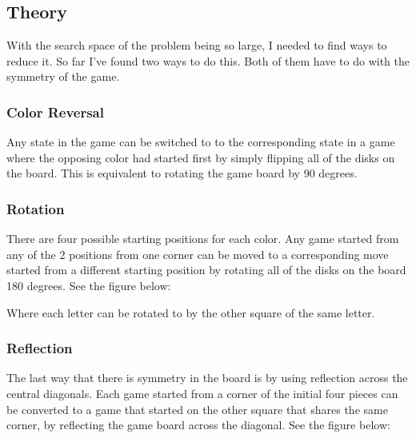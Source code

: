 \documentclass{article}
\begin{document}
\subsection{Theory}

With the search space of the problem being so large, I needed to find ways to reduce it. So far I've found two ways to do this. Both of them have to do with the symmetry of the game.

\subsubsection{Color Reversal}

Any state in the game can be switched to to the corresponding state in a game where the opposing color had started first by simply flipping all of the disks on the board. This is equivalent to rotating the game board by 90 degrees.

\subsubsection{Rotation}

There are four possible starting positions for each color. Any game started from any of the 2 positions from one corner can be moved to a corresponding move started from a different starting position by rotating all of the disks on the board 180 degrees. See the figure below:

\begin{othelloboard}{0.75}
\dotmarkings
{}
\end{othelloboard}

Where each letter can be rotated to by the other square of the same letter.

\subsubsection{Reflection}

The last way that there is symmetry in the board is by using reflection across the central diagonals. Each game started from a corner of the initial four pieces can be converted to a game that started on the other square that shares the same corner, by reflecting the game board across the diagonal. See the figure below:
\end{document}
